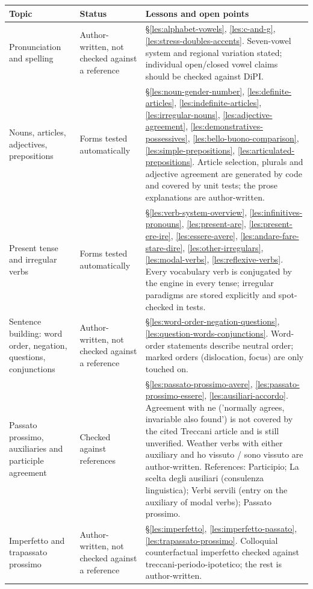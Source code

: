 \documentclass[11pt,a4paper,twoside,openright]{book}
\begin{document}
{\small\begin{xltabular}{\linewidth}{@{}p{3.6cm} p{2.6cm} L@{}}
\toprule
\textbf{Topic} & \textbf{Status} & \textbf{Lessons and open points} \\
\midrule
\endhead
Pronunciation and spelling & Author-written, not checked against a reference & \S\ref{les:alphabet-vowels}, \ref{les:c-and-g}, \ref{les:stress-doubles-accents}. Seven-vowel system and regional variation stated; individual open/closed vowel claims should be checked against DiPI. \\
Nouns, articles, adjectives, prepositions & Forms tested automatically & \S\ref{les:noun-gender-number}, \ref{les:definite-articles}, \ref{les:indefinite-articles}, \ref{les:irregular-nouns}, \ref{les:adjective-agreement}, \ref{les:demonstratives-possessives}, \ref{les:bello-buono-comparison}, \ref{les:simple-prepositions}, \ref{les:articulated-prepositions}. Article selection, plurals and adjective agreement are generated by code and covered by unit tests; the prose explanations are author-written. \\
Present tense and irregular verbs & Forms tested automatically & \S\ref{les:verb-system-overview}, \ref{les:infinitives-pronouns}, \ref{les:present-are}, \ref{les:present-ere-ire}, \ref{les:essere-avere}, \ref{les:andare-fare-stare-dire}, \ref{les:other-irregulars}, \ref{les:modal-verbs}, \ref{les:reflexive-verbs}. Every vocabulary verb is conjugated by the engine in every tense; irregular paradigms are stored explicitly and spot-checked in tests. \\
Sentence building: word order, negation, questions, conjunctions & Author-written, not checked against a reference & \S\ref{les:word-order-negation-questions}, \ref{les:question-words-conjunctions}. Word-order statements describe neutral order; marked orders (dislocation, focus) are only touched on. \\
Passato prossimo, auxiliaries and participle agreement & Checked against references & \S\ref{les:passato-prossimo-avere}, \ref{les:passato-prossimo-essere}, \ref{les:ausiliari-accordo}. Agreement with ne ('normally agrees, invariable also found') is not covered by the cited Treccani article and is still unverified. Weather verbs with either auxiliary and ho vissuto / sono vissuto are author-written. References: Participio; La scelta degli ausiliari (consulenza linguistica); Verbi servili (entry on the auxiliary of modal verbs); Passato prossimo. \\
Imperfetto and trapassato prossimo & Author-written, not checked against a reference & \S\ref{les:imperfetto}, \ref{les:imperfetto-passato}, \ref{les:trapassato-prossimo}. Colloquial counterfactual imperfetto checked against treccani-periodo-ipotetico; the rest is author-written. \\

\end{xltabular}}
\end{document}
